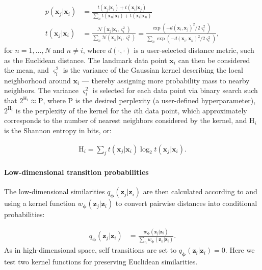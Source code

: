 \documentclass[11pt,a4paper,oneside]{book}
\begin{document}
\begin{doublespace}
\begin{appendices}
\begin{subequations}
    \begin{align}
    p(\mathbf{x}_j | \mathbf{x}_i) &= \frac{t(\mathbf{x}_j | \mathbf{x}_i) + t(\mathbf{x}_i | \mathbf{x}_j)}{\sum_{n} t(\mathbf{x}_n | \mathbf{x}_i) + t(\mathbf{x}_i | \mathbf{x}_n)} \label{eq:highd_sim}\\
    t(\mathbf{x}_j | \mathbf{x}_i) &= \frac{\mathcal{N}(\mathbf{x}_j | \mathbf{x}_i, \varsigma_i^{2})}{\sum_{n} \mathcal{N}(\mathbf{x}_n | \mathbf{x}_i, \varsigma_i^{2})} = \frac{\exp \left(-d(\mathbf{x}_i, \mathbf{x}_j)^2 / 2 \varsigma_i^{2}\right)}{\sum_{n} \exp \left(-d(\mathbf{x}_i, \mathbf{x}_n)^2 / 2 \varsigma_i^{2}\right)} \label{eq:transition},
    \end{align}
\end{subequations}
for $n = 1, \dots ,N$ and $n \neq i$, where $d(\cdot, \cdot)$ is a user-selected distance metric, such as the Euclidean distance. The landmark data point $\mathbf{x}_i$ can then be considered the mean, and $\varsigma_i^{2}$ is the variance of the Gaussian kernel describing the local neighborhood around $\mathbf{x}_i$ --- thereby assigning more probability mass to nearby neighbors. 
The variance $\varsigma_i^{2}$ is selected for each data point via binary search such that $2^{\mathrm{H}_i} \approx \mathrm{P}$, where $\mathrm{P}$ is the desired perplexity (a user-defined hyperparameter), $2^{\mathrm{H}_i}$ is the perplexity of the kernel for the $i$th data point, which approximately corresponds to the number of nearest neighbors considered by the kernel, and $\mathrm{H}_i$ is the Shannon entropy in bits, or:

\begin{align}
\mathrm{H}_i = \sum_{j} t(\mathbf{x}_j | \mathbf{x}_i) \log_2 t(\mathbf{x}_j | \mathbf{x}_i).
\end{align}
\paragraph{Low-dimensional transition probabilities} The low-dimensional similarities $q_{\boldsymbol{\phi}}(\mathbf{z}_j | \mathbf{z}_i)$ are then calculated according to \cite{hinton2003stochastic} and \cite{maaten2008tsne} using a kernel function $w_{\boldsymbol{\phi}}(\mathbf{z}_j | \mathbf{z}_i)$ to convert pairwise distances into conditional probabilities:

\begin{align}
    q_{\boldsymbol{\phi}}(\mathbf{z}_j | \mathbf{z}_i) &=  \frac{w_{\boldsymbol{\phi}}(\mathbf{z}_j | \mathbf{z}_i)}{\sum_{n} w_{\boldsymbol{\phi}}(\mathbf{z}_n | \mathbf{z}_i)}\label{eq:lowd_sim}.
\end{align}
As in high-dimensional space, self transitions are set to $q_{\boldsymbol{\phi}}(\mathbf{z}_i|\mathbf{z}_i) = 0$. Here we test two kernel functions for preserving Euclidean similarities. 

\end{appendices}
\end{doublespace}
\end{document}
